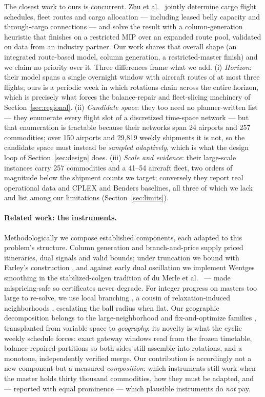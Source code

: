 \documentclass[11pt]{article}
\begin{document}
The closest work to ours is concurrent. Zhu et al.\ \cite{zhu2026} jointly
determine cargo flight schedules, fleet routes and cargo allocation ---
including leased belly capacity and through-cargo connections --- and solve
the result with a column-generation heuristic that finishes on a restricted
MIP over an expanded route pool, validated on data from an industry partner.
Our work shares that overall shape (an integrated route-based model, column
generation, a restricted-master finish) and we claim no priority over it.
Three differences frame what we add. (i) \emph{Horizon}: their model spans a
single overnight window with aircraft routes of at most three flights; ours
is a periodic week in which rotations chain across the entire horizon, which
is precisely what forces the balance-repair and fleet-slicing machinery of
Section~\ref{sec:regional}. (ii) \emph{Candidate space}: they too need no
planner-written list --- they enumerate every flight slot of a discretized
time-space network --- but that enumeration is tractable because their
networks span 24 airports and 257 commodities; over 150 airports and 29{,}819
weekly shipments it is not, so the candidate space must instead be
\emph{sampled adaptively}, which is what the design loop of
Section~\ref{sec:design} does. (iii) \emph{Scale and evidence}: their
large-scale instances carry 257 commodities and a 41--54 aircraft fleet, two
orders of magnitude below the shipment counts we target; conversely they
report real operational data and CPLEX and Benders baselines, all three of
which we lack and list among our limitations (Section~\ref{sec:limits}).

\paragraph{Related work: the instruments.} Methodologically we compose
established components, each adapted to this problem's structure.
Column generation and branch-and-price \cite{barnhart1998,lubbecke2005,
desaulniers2005,feillet2010} supply priced itineraries, dual signals and
valid bounds; under truncation we bound with Farley's construction
\cite{farley1990}, and against early dual oscillation we implement
Wentges smoothing \cite{wentges1997} in the stabilized-colgen tradition
of du Merle et al.\ \cite{dumerle1999} --- made mispricing-safe so
certificates never degrade. For integer progress on masters too large to
re-solve, we use local branching \cite{fischetti2003}, a cousin of
relaxation-induced neighborhoods \cite{danna2005}, escalating the ball
radius when flat. Our geographic decomposition belongs to the
large-neighborhood and fix-and-optimize families
\cite{shaw1998,ropke2006,helber2010}, transplanted from variable space to
\emph{geography}; its novelty is what the cyclic weekly schedule forces:
exact gateway windows read from the frozen timetable, balance-repaired
partitions so both sides still assemble into rotations, and a monotone,
independently verified merge. Our contribution is accordingly not a new
component but a measured \emph{composition}: which instruments still work
when the master holds thirty thousand commodities, how they must be
adapted, and --- reported with equal prominence --- which plausible
instruments do \emph{not} pay.
\end{document}
